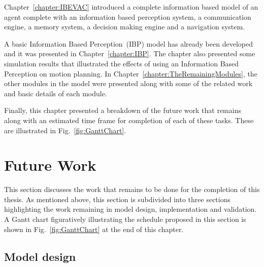 Chapter~\ref{chapter:IBEVAC} introduced a complete information based model of an agent complete with an information based perception system, a communication engine, a memory system, a decision making engine and a navigation system. 

A basic Information Based Perception~(IBP) model has already been developed and it was presented in Chapter~\ref{chapter:IBP}. The chapter also presented some simulation results that illustrated the effects of using an Information Based Perception on motion planning. In Chapter~\ref{chapter:TheRemainingModules}, the other modules in the model were presented along with some of the related work and basic details of each module.

Finally, this chapter presented a breakdown of the future work that remains along with an estimated time frame for completion of each of these tasks. These are illustrated in Fig.~\ref{fig:GanttChart}. 


\section{Future Work}
\label{CFW:FutureWork}
This section discusses the work that remains to be done for the completion of this thesis. As mentioned above, this section is subdivided into three sections highlighting the work remaining in model design, implementation and validation. A Gantt chart figuratively illustrating the schedule proposed in this section is shown in Fig.~\ref{fig:GanttChart} at the end of this chapter.

\subsection{Model design}
\label{CFW:ModelDesign}


